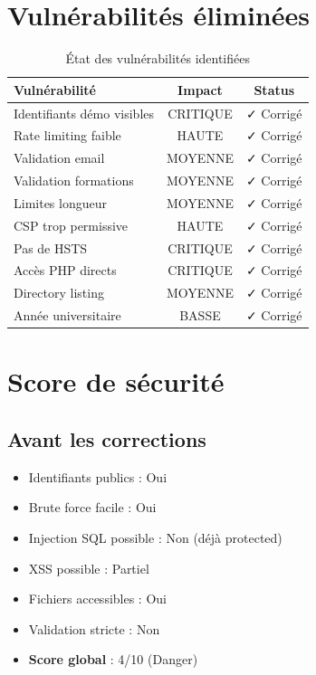 \documentclass[11pt,a4paper,french]{report}
\begin{document}
\section{Vulnérabilités éliminées}

\begin{table}[H]
\centering
\caption{État des vulnérabilités identifiées}
\begin{tabular}{|l|c|c|}
\hline
\textbf{Vulnérabilité} & \textbf{Impact} & \textbf{Status} \\
\hline
Identifiants démo visibles & CRITIQUE & ✓ Corrigé \\
\hline
Rate limiting faible & HAUTE & ✓ Corrigé \\
\hline
Validation email & MOYENNE & ✓ Corrigé \\
\hline
Validation formations & MOYENNE & ✓ Corrigé \\
\hline
Limites longueur & MOYENNE & ✓ Corrigé \\
\hline
CSP trop permissive & HAUTE & ✓ Corrigé \\
\hline
Pas de HSTS & CRITIQUE & ✓ Corrigé \\
\hline
Accès PHP directs & CRITIQUE & ✓ Corrigé \\
\hline
Directory listing & MOYENNE & ✓ Corrigé \\
\hline
Année universitaire & BASSE & ✓ Corrigé \\
\hline
\end{tabular}
\end{table}

\section{Score de sécurité}

\subsection{Avant les corrections}

\begin{itemize}
    \item Identifiants publics : Oui
    \item Brute force facile : Oui
    \item Injection SQL possible : Non (déjà protected)
    \item XSS possible : Partiel
    \item Fichiers accessibles : Oui
    \item Validation stricte : Non
    \item \textbf{Score global} : 4/10 (Danger)
\end{itemize}
\end{document}
